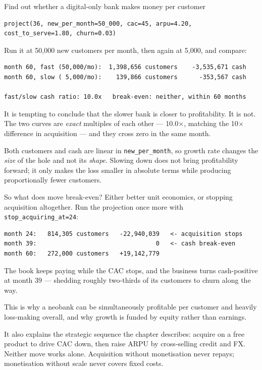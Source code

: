 \begin{labproject}{Find out whether a digital-only bank makes money per customer}
\begin{lstlisting}[style=mlpython]
project(36, new_per_month=50_000, cac=45, arpu=4.20, cost_to_serve=1.80, churn=0.03)
\end{lstlisting}

Run it at 50{,}000 new customers per month, then again at 5{,}000, and compare:

\begin{lstlisting}[style=mlterminal]
month 60, fast (50,000/mo):  1,398,656 customers    -3,535,671 cash
month 60, slow ( 5,000/mo):    139,866 customers      -353,567 cash

fast/slow cash ratio: 10.0x   break-even: neither, within 60 months
\end{lstlisting}

\begin{pitfall}
It is tempting to conclude that the slower bank is closer to profitability. It is not. The two curves are \emph{exact} multiples of each other --- 10.0$\times$, matching the 10$\times$ difference in acquisition --- and they cross zero in the same month.

Both customers and cash are linear in \texttt{new\_per\_month}, so growth rate changes the \emph{size} of the hole and not its \emph{shape}. Slowing down does not bring profitability forward; it only makes the loss smaller in absolute terms while producing proportionally fewer customers.
\end{pitfall}

So what does move break-even? Either better unit economics, or stopping acquisition altogether. Run the projection once more with \texttt{stop\_acquiring\_at=24}:

\begin{lstlisting}[style=mlterminal]
month 24:   814,305 customers   -22,940,039   <- acquisition stops
month 39:                                 0   <- cash break-even
month 60:   272,000 customers   +19,142,779
\end{lstlisting}

The book keeps paying while the CAC stops, and the business turns cash-positive at month 39 --- shedding roughly two-thirds of its customers to churn along the way.

\begin{keyidea}
This is why a neobank can be simultaneously profitable per customer and heavily loss-making overall, and why growth is funded by equity rather than earnings.

It also explains the strategic sequence the chapter describes: acquire on a free product to drive CAC down, then raise ARPU by cross-selling credit and FX. Neither move works alone. Acquisition without monetisation never repays; monetisation without scale never covers fixed costs.


\end{keyidea}
\end{labproject}
